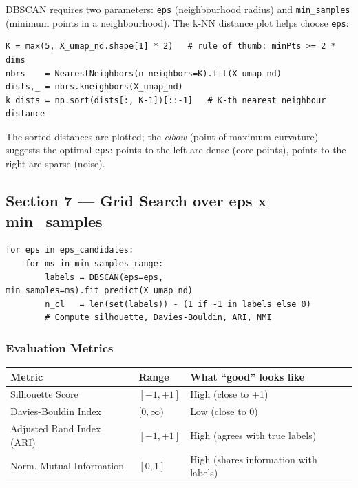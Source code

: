 \documentclass[12pt,a4paper]{article}
\begin{document}
DBSCAN requires two parameters: \texttt{eps} (neighbourhood radius) and \texttt{min\_samples} (minimum points in a neighbourhood). The k-NN distance plot helps choose \texttt{eps}:

\begin{lstlisting}
K = max(5, X_umap_nd.shape[1] * 2)   # rule of thumb: minPts >= 2 * dims
nbrs    = NearestNeighbors(n_neighbors=K).fit(X_umap_nd)
dists,_ = nbrs.kneighbors(X_umap_nd)
k_dists = np.sort(dists[:, K-1])[::-1]   # K-th nearest neighbour distance
\end{lstlisting}

The sorted distances are plotted; the \textit{elbow} (point of maximum curvature) suggests the optimal \texttt{eps}: points to the left are dense (core points), points to the right are sparse (noise).

\subsection{Section 7 --- Grid Search over eps x min\_samples}

\begin{lstlisting}
for eps in eps_candidates:
    for ms in min_samples_range:
        labels = DBSCAN(eps=eps, min_samples=ms).fit_predict(X_umap_nd)
        n_cl   = len(set(labels)) - (1 if -1 in labels else 0)
        # Compute silhouette, Davies-Bouldin, ARI, NMI
\end{lstlisting}

\subsubsection{Evaluation Metrics}

\begin{center}
\begin{tabular}{lll}
\toprule
\textbf{Metric} & \textbf{Range} & \textbf{What ``good'' looks like} \\
\midrule
Silhouette Score & $[-1, +1]$ & High (close to +1) \\
Davies-Bouldin Index & $[0, \infty)$ & Low (close to 0) \\
Adjusted Rand Index (ARI) & $[-1, +1]$ & High (agrees with true labels) \\
Norm. Mutual Information & $[0, 1]$ & High (shares information with labels) \\
\bottomrule
\end{tabular}
\end{center}
\end{document}
